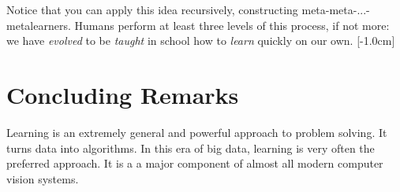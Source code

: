 Notice that you can apply this idea recursively, constructing meta-meta-...-metalearners. Humans perform at least three levels of this process, if not more: we have \emph{evolved} to be \emph{taught} in school how to \emph{learn} quickly on our own.
[-1.0cm]

\section{Concluding Remarks}
Learning is an extremely general and powerful approach to problem solving. It turns data into algorithms. In this era of big data, learning is very often the preferred approach. It is a a major component of almost all modern computer vision systems.
